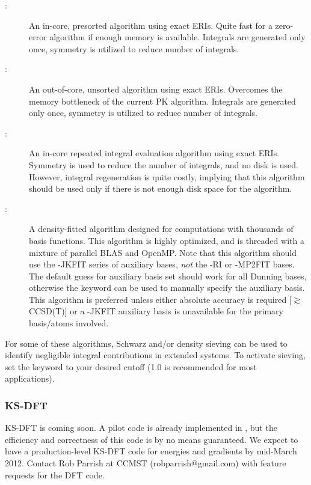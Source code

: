 \begin{description}
\item[:] An in-core, presorted algorithm using exact ERIs. Quite fast
for a zero-error algorithm if enough memory is available. Integrals are
generated only once, symmetry is utilized to reduce number of integrals. 
\item[:] An out-of-core, unsorted algorithm using exact
ERIs. Overcomes the memory bottleneck of the current PK algorithm. Integrals are
generated only once, symmetry is utilized to reduce number of integrals. 
\item[:] An in-core repeated integral evaluation algorithm using
exact ERIs. Symmetry is used to reduce the number of integrals, and no disk is
used. However, integral regeneration is quite costly, implying that this
algorithm should be used only if there is not enough disk space for the
 algorithm. 
\item[:] A density-fitted algorithm designed for computations with
thousands of basis functions. This algorithm is highly optimized, and is
threaded with a mixture of parallel BLAS and OpenMP. Note that this algorithm
should use the -JKFIT series of auxiliary bases, \emph{not} the -RI or -MP2FIT
bases. The default guess for auxiliary basis set should work for all Dunning
bases, otherwise the  keyword can be used to manually
specify the auxiliary basis. This algorithm is preferred unless either
absolute accuracy is required [$\gtrsim$CCSD(T)] or a -JKFIT auxiliary basis is
unavailable for the primary basis/atoms involved. 
\end{description}

For some of these algorithms, Schwarz and/or density sieving can be used to
identify negligible integral contributions in extended systems. To activate
sieving, set the  keyword to your desired cutoff
(1.0 is recommended for most applications).

\subsubsection{KS-DFT} 

KS-DFT is coming soon. A pilot code is already implemented in \PSIfour, but the
efficiency and correctness of this code is by no means guaranteed. We expect to
have a production-level KS-DFT code for energies and gradients by mid-March
2012. Contact Rob Parrish at CCMST (robparrish@gmail.com) with feature requests
for the DFT code. 

